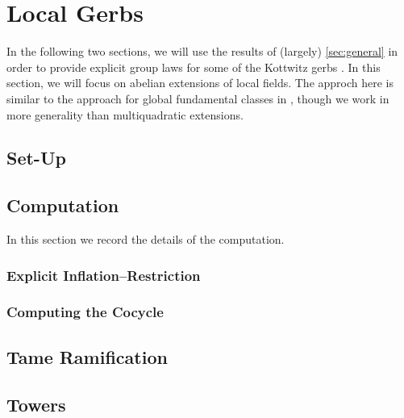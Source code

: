\documentclass{article}
\numberwithin{equation}{section}
\begin{document}
\section{Local Gerbs} \label{sec:local}
In the following two sections, we will use the results of (largely) \autoref{sec:general} in order to provide explicit group laws for some of the Kottwitz gerbs \cite{kottwitz}. In this section, we will focus on abelian extensions of local fields. The approch here is similar to the approach for global fundamental classes in \cite{explicit-fund-classes}, though we work in more generality than multiquadratic extensions.

\subsection{Set-Up} \label{sec:setup}


\subsection{Computation}
In this section we record the details of the computation.

\subsubsection{Explicit Inflation--Restriction}


\subsubsection{Computing the Cocycle}


% 

% 

\subsection{Tame Ramification}


\subsection{Towers}

\end{document}
